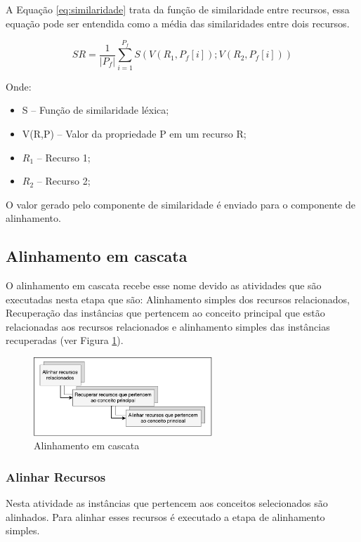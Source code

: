 A Equação \ref{eq:similaridade} trata da função de similaridade entre recursos, essa equação pode ser entendida como a média das similaridades entre dois recursos.

\begin{equation}
SR  = \frac{1}{|P_f|} { \sum_{i = 1}^{P_f} {S(V(R_1,P_f[i]);V(R_2,P_f[i]))}}
\label{eq:similaridade}
\end{equation}

Onde:

\begin{itemize}
	\item S – Função de similaridade léxica;
	\item V(R,P) – Valor da propriedade P em um recurso R;
	\item $R_1$ – Recurso 1;
	\item $R_2$ – Recurso 2;
\end{itemize}

O valor gerado pelo componente de similaridade é enviado para o componente de alinhamento.

\subsection{Alinhamento em cascata}
O alinhamento em cascata recebe esse nome devido as atividades que são executadas nesta etapa que são: Alinhamento simples dos recursos relacionados, Recuperação das instâncias que pertencem ao conceito principal que estão relacionadas aos recursos relacionados e alinhamento simples das instâncias recuperadas (ver Figura \ref{fig:cascata}).

\begin{figure}[!ht]
	\centering
	\includegraphics[width=0.6\textwidth]{./imagens/cascata.pdf}
	\caption{Alinhamento em cascata}
	\label{fig:cascata}
\end{figure}

\subsubsection{Alinhar Recursos}

Nesta atividade as instâncias que pertencem aos conceitos selecionados são alinhados. Para alinhar esses recursos é executado a etapa de alinhamento simples.

